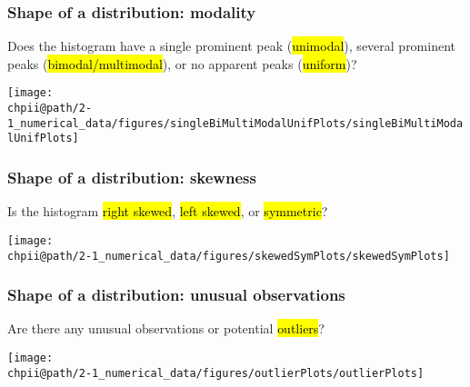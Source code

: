 \documentclass[slidestop,compress,mathserif]{beamer}
\makeatletter
\def\chpii@path{../../Chp 2}
\makeatother
\begin{document}
\begin{frame}
\frametitle{Shape of a distribution: modality}

Does the histogram have a single prominent peak (\hl{unimodal}), several prominent peaks (\hl{bimodal/multimodal}), or no apparent peaks (\hl{uniform})?

\begin{center}
\texttt{[image: \\chpii@path/2-1\_numerical\_data/figures/singleBiMultiModalUnifPlots/singleBiMultiModalUnifPlots]}
\end{center}


\end{frame}


\begin{frame}
\frametitle{Shape of a distribution: skewness}

Is the histogram \hl{right skewed}, \hl{left skewed}, or \hl{symmetric}?

\begin{center}
\texttt{[image: \\chpii@path/2-1\_numerical\_data/figures/skewedSymPlots/skewedSymPlots]}
\end{center}


\end{frame}


\begin{frame}
\frametitle{Shape of a distribution: unusual observations}

Are there any unusual observations or potential \hl{outliers}?

\begin{center}
\texttt{[image: \\chpii@path/2-1\_numerical\_data/figures/outlierPlots/outlierPlots]}
\end{center}

\end{frame}


\end{document}
